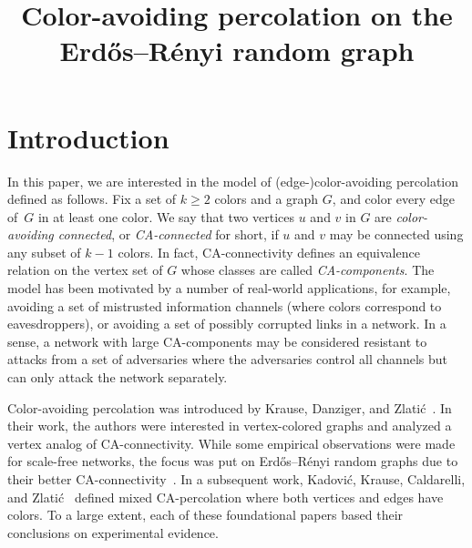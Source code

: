 \documentclass[AHL,Unicode,longabstracts,published]{cedram}
\title[Color-avoiding percolation on the Erd\H{o}s--Rényi random graph]{Color-avoiding percolation on the Erd\H{o}s--Rényi random graph}
\author[\initial{L.} \lastname{Lichev}]{\firstname{Lyuben} \lastname{Lichev}}
\author[\initial{B.} \lastname{Schapira}]{\firstname{Bruno} \lastname{Schapira}}
\begin{document}
\maketitle

\section{Introduction}

In this paper, we are interested in the model of (edge-)color-avoiding percolation defined as follows. Fix a set of $k\ge 2$ colors and a graph $G$, and color every edge of~$G$ in at least one color. We say that two vertices $u$ and $v$ in $G$ are \emph{color-avoiding connected}, or \emph{CA-connected} for short, if $u$ and $v$ may be connected using any subset of $k-1$ colors. In fact, CA-connectivity defines an equivalence relation on the vertex set of $G$ whose classes are called \emph{CA-components}. The model has been motivated by a number of real-world applications, for example, avoiding a set of mistrusted information channels (where colors correspond to eavesdroppers), or avoiding a set of possibly corrupted links in a network. In a sense, a network with large CA-components may be considered resistant to attacks from a set of adversaries where the adversaries control all channels but can only attack the network separately.

Color-avoiding percolation was introduced by Krause, Danziger, and Zlati\'c~\cite{KDZ16, KDZ17}. In their work, the authors were interested in vertex-colored graphs and analyzed a vertex analog of CA-connectivity. While some empirical observations were made for scale-free networks, the focus was put on Erd\H{o}s--Rényi random graphs due to their better CA-connectivity~\cite{KDZ16}. In a subsequent work, Kadovi\'c, Krause, Caldarelli, and Zlati\'c~\cite{KKCZ18} defined mixed CA-percolation where both vertices and edges have colors. To a large extent, each of these foundational papers based their conclusions on experimental evidence.
\end{document}
